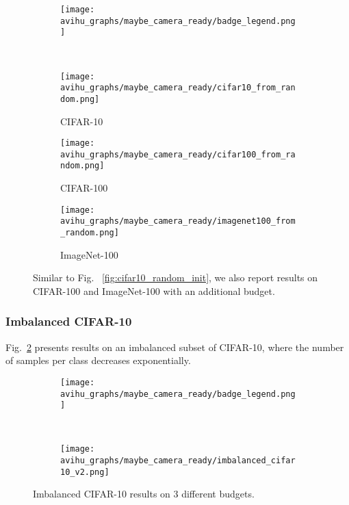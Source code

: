 \documentclass{article}
\begin{document}
\begin{figure}[htb!]
\begin{subfigure}{.45\textwidth}
  \centering
 \texttt{[image: avihu\_graphs/maybe\_camera\_ready/badge\_legend.png]}
\end{subfigure}
\\
\begin{center}
    \begin{subfigure}{.157\textwidth}
      \centering
      \texttt{[image: avihu\_graphs/maybe\_camera\_ready/cifar10\_from\_random.png]}
\caption{CIFAR-10}
    \end{subfigure}
    \begin{subfigure}{.157\textwidth}
      \centering
      \texttt{[image: avihu\_graphs/maybe\_camera\_ready/cifar100\_from\_random.png]}
\caption{CIFAR-100}
    \end{subfigure}
    \begin{subfigure}{.157\textwidth}
      \centering
      \texttt{[image: avihu\_graphs/maybe\_camera\_ready/imagenet100\_from\_random.png]}
\caption{ImageNet-100}
    \end{subfigure}
\caption{Similar to Fig. ~\ref{fig:cifar10_random_init}, we also report results on CIFAR-100 and ImageNet-100 with an additional budget.}
\vspace{-0.3cm}
\label{fig:app:random_init_pool}
\end{center}
\end{figure}


\subsubsection{Imbalanced CIFAR-10}
Fig.~\ref{fig:app:imbalanced_data} presents results on an imbalanced subset of CIFAR-10, where the number of samples per class decreases exponentially.


\begin{figure}[htb!]
\begin{center}
\begin{subfigure}{.45\textwidth}
  \centering
 \texttt{[image: avihu\_graphs/maybe\_camera\_ready/badge\_legend.png]}
\end{subfigure}
\\
    \begin{subfigure}{.45\textwidth}
      \centering
      \texttt{[image: avihu\_graphs/maybe\_camera\_ready/imbalanced\_cifar10\_v2.png]}
\end{subfigure}
\caption{Imbalanced CIFAR-10 results on $3$ different budgets.}
\vspace{-0.3cm}
\label{fig:app:imbalanced_data}
\end{center}
\end{figure}
\end{document}
